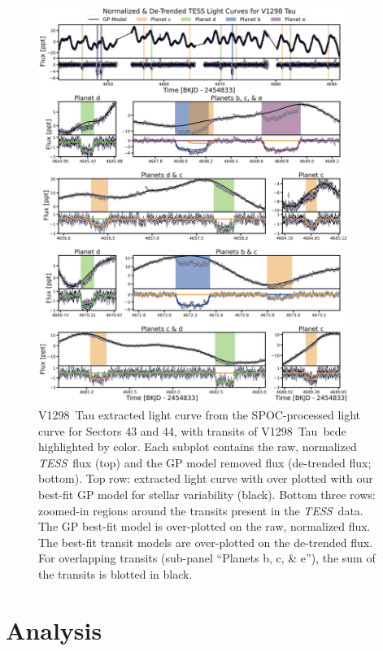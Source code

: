 \documentclass[twocolumn]{aastex631}
\newcommand{\tess}{\textit{TESS}}
\newcommand{\sname}{V1298~Tau\xspace}
\newcommand{\allplanets}{V1298~Tau~bcde\xspace}
\begin{document}
\begin{figure}[hbtp]
\begin{center}
\includegraphics[width=0.9\textwidth,trim={0.25cm 0 0 0}]{static/transits.pdf}
\caption{\sname extracted light curve from the SPOC-processed light curve for Sectors 43 and 44, with transits of \allplanets highlighted by color. Each subplot contains the raw, normalized \tess\ flux (top) and the GP model removed flux (de-trended flux; bottom). Top row: extracted light curve with over plotted with our best-fit GP model for stellar variability (black). Bottom three rows: zoomed-in regions around the transits present in the \tess\ data. The GP best-fit model is over-plotted on the raw, normalized flux. The best-fit transit models are over-plotted on the de-trended flux. For overlapping transits (sub-panel ``Planets b, c, \& e''), the sum of the transits is blotted in black.} \label{fig:transits}
\end{center}
\end{figure}

\section{Analysis} \label{sec:analysis}
\end{document}
